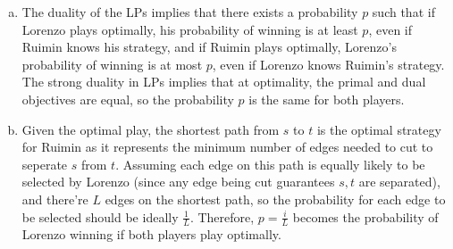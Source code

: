 \documentclass[10pt]{article}
\begin{document}
\begin{solution}
\begin{enumerate} [(a)]
    \item The duality of the LPs implies that there exists a probability $p$ such that if Lorenzo plays optimally, his probability of winning is at least $p$, even if Ruimin knows his strategy, and if Ruimin plays optimally, Lorenzo's probability of winning is at most $p$, even if Lorenzo knows Ruimin's strategy. The strong duality in LPs implies that at optimality, the primal and dual objectives are equal, so the probability $p$ is the same for both players.
    \item Given the optimal play, the shortest path from $s$ to $t$ is the optimal strategy for Ruimin as it represents the minimum number of edges needed to cut to seperate $s$ from $t$. Assuming each edge on this path is equally likely to be selected by Lorenzo (since any edge being cut guarantees $s, t$ are separated), and there're $L$ edges on the shortest path, so the probability for each edge to be selected should be ideally $\frac{1}{L}$. Therefore, $p = \frac{i}{L}$ becomes the probability of Lorenzo winning if both players play optimally.
\end{enumerate}
\end{solution}
\end{document}
